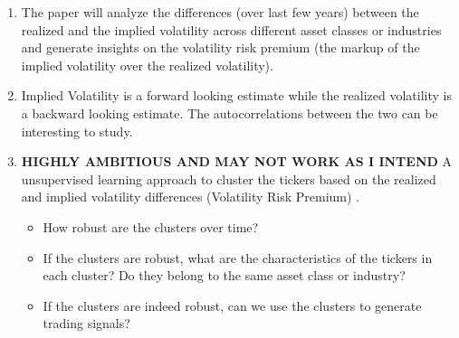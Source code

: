 \documentclass{article}[16pt]
\begin{document}
\begin{enumerate}
    \item The paper will analyze the differences (over last few years) between the realized and the implied volatility across different asset classes or industries and generate insights on the volatility risk premium (the markup of the implied volatility over the realized volatility).

    \item Implied Volatility is a forward looking estimate while the realized volatility is a backward looking estimate. The autocorrelations between the two can be interesting to study.

    \item \textbf{HIGHLY AMBITIOUS AND MAY NOT WORK AS I INTEND}
          A unsupervised learning approach to cluster the tickers based on the realized and implied volatility differences (Volatility Risk Premium) .
          \begin{itemize}
              \item How robust are the clusters over time?
              \item If the clusters are robust, what are the characteristics of the tickers in each cluster? Do they belong to the same asset class or industry?
              \item If the clusters are indeed robust, can we use the clusters to generate trading signals?
          \end{itemize}

\end{enumerate}
\end{document}
